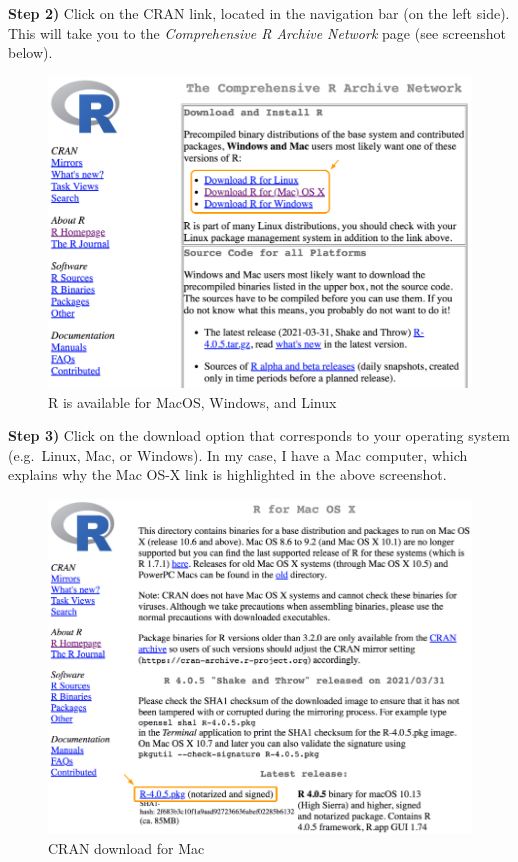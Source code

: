 \documentclass[
]{book}
\begin{document}
\textbf{Step 2)} Click on the CRAN link, located in the navigation bar (on the left
side). This will take you to the \emph{Comprehensive R Archive Network} page (see
screenshot below).

\begin{figure}

{\centering \includegraphics[width=0.7\linewidth]{images/install/cran-download} 

}

\caption{R is available for MacOS, Windows, and Linux}\label{fig:unnamed-chunk-7}
\end{figure}

\textbf{Step 3)} Click on the download option that corresponds to your operating
system (e.g.~Linux, Mac, or Windows). In my case, I have a Mac computer, which
explains why the Mac OS-X link is highlighted in the above screenshot.

\begin{figure}

{\centering \includegraphics[width=0.7\linewidth]{images/install/cran-mac} 

}

\caption{CRAN download for Mac}\label{fig:unnamed-chunk-8}
\end{figure}
\end{document}
